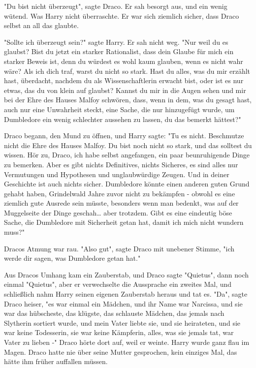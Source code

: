 {"Du bist nicht überzeugt", sagte Draco. Er sah besorgt aus, und ein wenig wütend. Was Harry nicht überraschte. Er war sich ziemlich sicher, dass Draco selbst an all das glaubte.

"Sollte ich überzeugt sein?" sagte Harry. Er sah nicht weg. "Nur weil du es glaubst? Bist du jetzt ein starker Rationalist, dass dein Glaube für mich ein starker Beweis ist, denn du würdest es wohl kaum glauben, wenn es nicht wahr wäre? Als ich dich traf, warst du nicht so stark. Hast du alles, was du mir erzählt hast, überdacht, nachdem du als Wissenschaftlerin erwacht bist, oder ist es nur etwas, das du von klein auf glaubst? Kannst du mir in die Augen sehen und mir bei der Ehre des Hauses Malfoy schwören, dass, wenn in dem, was du gesagt hast, auch nur eine Unwahrheit steckt, eine Sache, die nur hinzugefügt wurde, um Dumbledore ein wenig schlechter aussehen zu lassen, du das bemerkt hättest?"

Draco begann, den Mund zu öffnen, und Harry sagte: "Tu es nicht. Beschmutze nicht die Ehre des Hauses Malfoy. Du bist noch nicht so stark, und das solltest du wissen. Hör zu, Draco, ich habe selbst angefangen, ein paar beunruhigende Dinge zu bemerken. Aber es gibt nichts Definitives, nichts Sicheres, es sind alles nur Vermutungen und Hypothesen und unglaubwürdige Zeugen. Und in deiner Geschichte ist auch nichts sicher. Dumbledore könnte einen anderen guten Grund gehabt haben, Grindelwald Jahre zuvor nicht zu bekämpfen - obwohl es eine ziemlich gute Ausrede sein müsste, besonders wenn man bedenkt, was auf der Muggelseite der Dinge geschah… aber trotzdem. Gibt es eine eindeutig böse Sache, die Dumbledore mit Sicherheit getan hat, damit ich mich nicht wundern muss?"

Dracos Atmung war rau. "Also gut", sagte Draco mit unebener Stimme, "ich werde dir sagen, was Dumbledore getan hat."

Aus Dracos Umhang kam ein Zauberstab, und Draco sagte "Quietus", dann noch einmal "Quietus", aber er verwechselte die Aussprache ein zweites Mal, und schließlich nahm Harry seinen eigenen Zauberstab heraus und tat es. "Da", sagte Draco heiser, "es war einmal ein Mädchen, und ihr Name war Narcissa, und sie war das hübscheste, das klügste, das schlauste Mädchen, das jemals nach Slytherin sortiert wurde, und mein Vater liebte sie, und sie heirateten, und sie war keine Todesserin, sie war keine Kämpferin, alles, was sie jemals tat, war Vater zu lieben -" Draco hörte dort auf, weil er weinte. Harry wurde ganz flau im Magen. Draco hatte nie über seine Mutter gesprochen, kein einziges Mal, das hätte ihm früher auffallen müssen.

}
